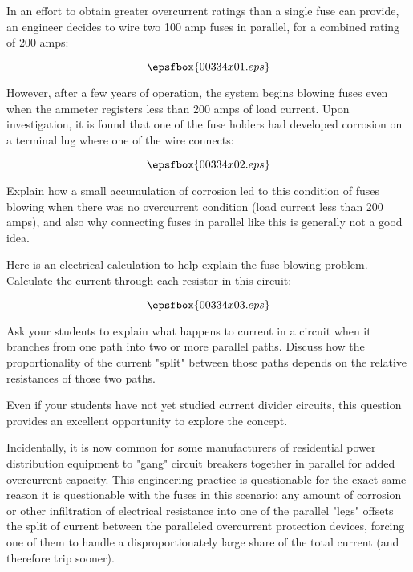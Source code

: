 

In an effort to obtain greater overcurrent ratings than a single fuse can provide, an engineer decides to wire two 100 amp fuses in parallel, for a combined rating of 200 amps:

$$\epsfbox{00334x01.eps}$$

However, after a few years of operation, the system begins blowing fuses even when the ammeter registers less than 200 amps of load current.  Upon investigation, it is found that one of the fuse holders had developed corrosion on a terminal lug where one of the wire connects:

$$\epsfbox{00334x02.eps}$$

Explain how a small accumulation of corrosion led to this condition of fuses blowing when there was no overcurrent condition (load current less than 200 amps), and also why connecting fuses in parallel like this is generally not a good idea.







Here is an electrical calculation to help explain the fuse-blowing problem.  Calculate the current through each resistor in this circuit:

$$\epsfbox{00334x03.eps}$$







Ask your students to explain what happens to current in a circuit when it branches from one path into two or more parallel paths.  Discuss how the proportionality of the current "split" between those paths depends on the relative resistances of those two paths.

Even if your students have not yet studied current divider circuits, this question provides an excellent opportunity to explore the concept.

Incidentally, it is now common for some manufacturers of residential power distribution equipment to "gang" circuit breakers together in parallel for added overcurrent capacity.  This engineering practice is questionable for the exact same reason it is questionable with the fuses in this scenario: any amount of corrosion or other infiltration of electrical resistance into one of the parallel "legs" offsets the split of current between the paralleled overcurrent protection devices, forcing one of them to handle a disproportionately large share of the total current (and therefore trip sooner).




